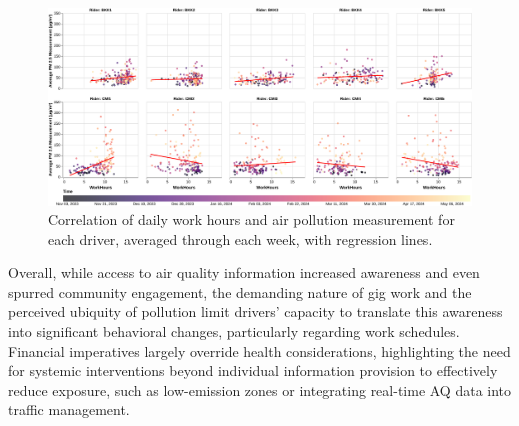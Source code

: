 \begin{figure}
    \centering
    \includegraphics[width=\textwidth]{figures/work-hours-vs-aqi-per-rider-regression.pdf}
    \caption{Correlation of daily work hours and air pollution measurement for each driver, averaged through each week, with regression lines.
    }
    \Description{}
    \label{fig:work-hours-vs-aqi-per-rider}
\end{figure}

Overall, while access to air quality information increased awareness and even spurred community engagement, the demanding nature of gig work and the perceived ubiquity of pollution limit drivers' capacity to translate this awareness into significant behavioral changes, particularly regarding work schedules.
Financial imperatives largely override health considerations, highlighting the need for systemic interventions beyond individual information provision to effectively reduce exposure, such as low-emission zones or integrating real-time AQ data into traffic management.
